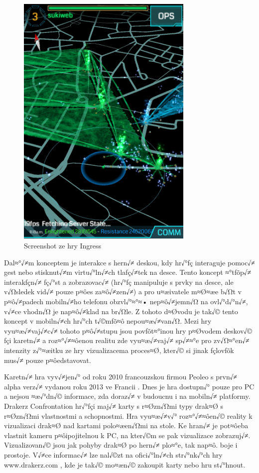 \documentclass[twoside,12pt]{article}
\begin{document}
\begin{figure}[H]
    \includegraphics[width=320px, center]{images/ingress.jpg}
    \caption{Screenshot ze hry Ingress}
    \label{ingress_screenshot}
\end{figure}

Dal≈°√≠m konceptem je interakce s hern√≠ deskou, kdy hr√°ƒç interaguje pomoc√≠ gest nebo stisknut√≠m virtu√°ln√≠ch tlaƒç√≠tek na desce. Tento koncept ≈°tƒõp√≠ interakƒçn√≠ ƒç√°st a zobrazovac√≠ (hr√°ƒç manipuluje s prvky na desce, ale v√Ωsledek vid√≠ pouze p≈ôes za≈ô√≠zen√≠) a pro u≈æivatele m≈Ø≈æe b√Ωt v p≈ô√≠padech mobiln√≠ho telefonu obzvl√°≈°≈• nep≈ô√≠jemn√Ω na ovl√°d√°n√≠, v√≠ce vhodn√Ω je nap≈ô√≠klad na br√Ωle. Z tohoto d≈Øvodu je tak√© tento koncept v mobiln√≠ch hr√°ch t√©mƒõ≈ô nepou≈æ√≠van√Ω. Mezi hry vyu≈æ√≠vaj√≠c√≠ tohoto p≈ô√≠stupu jsou povƒõt≈°inou hry p≈Øvodem deskov√© ƒçi karetn√≠ a roz≈°√≠≈ôenou realitu zde vyu≈æ√≠vaj√≠ sp√≠≈°e pro zv√Ω≈°en√≠ intenzity z√°≈æitku ze hry vizualizacema proces≈Ø, kter√© si jinak ƒçlovƒõk mus√≠ pouze p≈ôedstavovat. 

%
%

Karetn√≠ hra vyv√≠jen√° od roku 2010 francouzskou firmou Peoleo s prvn√≠ alpha verz√≠ vydanou roku 2013 ve Francii \cite{venturebeat}. Dnes je hra dostupn√° pouze pro PC a nejsou ≈æ√°dn√© informace, zda doraz√≠ v budoucnu i na mobiln√≠ platformy. Drakerz Confrontation hr√°ƒçi maj√≠ karty s r≈Øzn√Ωmi typy drak≈Ø s r≈Øzn√Ωmi vlastnostmi a schopnostmi. Hra vyu≈æ√≠v√° roz≈°√≠≈ôen√© reality k vizualizaci drak≈Ø nad kartami polo≈æen√Ωmi na stole. Ke hran√≠ je pot≈ôeba vlastnit kameru p≈ôipojitelnou k PC, na kter√©m se pak vizualizace zobrazuj√≠. Vizualizovan√© jsou jak pohyby drak≈Ø po hern√≠ plo≈°e, tak nap≈ô. boje i prostoje. V√≠ce informac√≠ lze nal√©zt na ofici√°ln√≠ch str√°nk√°ch hry www.drakerz.com \cite{peoleo_about}, kde je tak√© mo≈æn√© zakoupit karty nebo hru st√°hnout.
\end{document}
